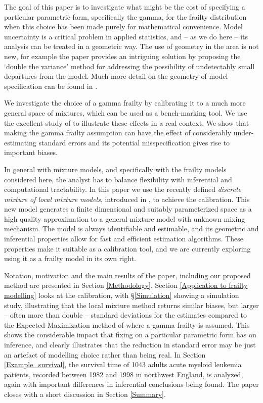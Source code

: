 \documentclass[graybox]{svmult}
\begin{document}
 The goal of this paper is to investigate what might be the  cost  of
specifying a particular parametric form, specifically the gamma, for the frailty distribution when  this choice has been made purely for mathematical convenience.  Model uncertainty is a critical problem in applied statistics, and -- as we do here --  its analysis can be treated in a geometric way. The use of geometry in the area is not new, for example the  paper \cite{copas2005local} provides an intriguing solution by proposing  the `double the variance' method for addressing the possibility of undetectably small departures from the model.  Much more detail on the geometry of model specification  can be found in \cite{Anaya2016CIG}.


We investigate the choice of a gamma frailty by calibrating it to a much more general space of mixtures, which can be used as a bench-marking  tool. We use the excellent study of
\cite{Henderson2002} to illustrate these effects in a real context. We  show that 
making  the gamma frailty assumption can have the effect of considerably under-estimating standard errors and its potential
misspecification gives rise to  important biases.  



In general with mixture models, and specifically with the frailty models considered here, the analyst has to balance flexibility with   inferential and computational tractability. In this paper we  use the recently defined {\em discrete mixture of local mixture models}, introduced in \cite{Maroufy2016a}, to achieve the  calibration.  This new model
 generates  a finite dimensional and suitably  parameterized space as a high quality approximation  to a general mixture model with unknown mixing
mechanism. The model is  always identifiable and estimable, and its geometric and inferential properties allow for
fast and efficient estimation algorithms.  These properties make it suitable as a calibration tool, and we are currently exploring using it as a frailty model in its own right.





Notation, motivation and the main results of the paper, including our proposed method
are presented in Section \ref{Methodology}.  Section \ref{Application to frailty modelling} looks at the calibration, with  \S  \ref{Simulation} showing a
simulation study, illustrating that the local mixture method returns similar biases, but larger --
often more than double -- standard deviations for the estimates compared to the Expected-Maximization method
of \cite{Klein1992} where a gamma frailty is assumed. This shows the  considerable impact that fixing on a particular parametric form has on inference, and clearly illustrates that the reduction in standard error may be just an artefact of modelling choice rather than being  real.
 In Section \ref{Example_survival}, the survival time of 1043
adults acute myeloid leukemia patients, recorded between 1982 and 1998 in northwest England, is analyzed, again with important differences in  inferential conclusions being found.
The paper  closes with a short discussion in Section \ref{Summary}.
\end{document}
